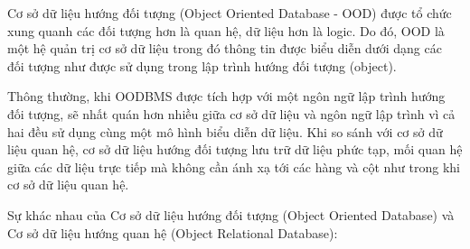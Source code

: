 Cơ sở dữ liệu hướng đối tượng (Object Oriented Database - OOD) được tổ chức xung quanh các đối tượng hơn là quan hệ, dữ liệu hơn là logic. Do đó, OOD là một hệ quản trị cơ sở dữ liệu trong đó thông tin được biểu diễn dưới dạng các đối tượng như được sử dụng trong lập trình hướng đối tượng (object).\par

Thông thường, khi OODBMS được tích hợp với một ngôn ngữ lập trình hướng đối tượng, sẽ nhất quán hơn nhiều giữa cơ sở dữ liệu và ngôn ngữ lập trình vì cả hai đều sử dụng cùng một mô hình biểu diễn dữ liệu. Khi so sánh với cơ sở dữ liệu quan hệ, cơ sở dữ liệu hướng đối tượng lưu trữ dữ liệu phức tạp, mối quan hệ giữa các dữ liệu trực tiếp mà không cần ánh xạ tới các hàng và cột như trong khi cơ sở dữ liệu quan hệ.\par

Sự khác nhau của Cơ sở dữ liệu hướng đối tượng (Object Oriented Database) và Cơ sở dữ liệu hướng quan hệ (Object Relational Database):\\

